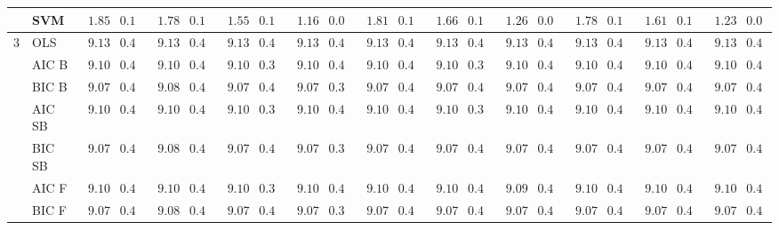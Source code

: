 \begin{tabular}{p{0.2cm}p{1cm}|p{0.6cm}p{0.6cm}|p{0.6cm}p{0.6cm}p{0.6cm}p{0.6cm}p{0.6cm}p{0.6cm}|p{0.6cm}p{0.6cm}p{0.6cm}p{0.6cm}p{0.6cm}p{0.6cm}|p{0.6cm}p{0.6cm}p{0.6cm}p{0.6cm}p{0.6cm}p{0.6cm}}
 & SVM  & $\phantom{0}1.85$ & $0.14$ & $\phantom{0}1.78$ & $0.12$ & $\phantom{0}1.55$ & $0.11$ & $\phantom{0}1.16$ & $0.08$ & $\phantom{0}1.81$ & $0.12$ & $\phantom{0}1.66$ & $0.12$ & $\phantom{0}1.26$ & $0.09$ & $\phantom{0}1.78$ & $0.12$ & $\phantom{0}1.61$ & $0.10$ & $\phantom{0}1.23$ & $0.08$ \\\hline
3 & OLS  & $\phantom{0}9.13$ & $0.40$ & $\phantom{0}9.13$ & $0.40$ & $\phantom{0}9.13$ & $0.40$ & $\phantom{0}9.13$ & $0.40$ & $\phantom{0}9.13$ & $0.40$ & $\phantom{0}9.13$ & $0.40$ & $\phantom{0}9.13$ & $0.40$ & $\phantom{0}9.13$ & $0.40$ & $\phantom{0}9.13$ & $0.40$ & $\phantom{0}9.13$ & $0.40$ \\
 & AIC B  & $\phantom{0}9.10$ & $0.40$ & $\phantom{0}9.10$ & $0.40$ & $\phantom{0}9.10$ & $0.39$ & $\phantom{0}9.10$ & $0.40$ & $\phantom{0}9.10$ & $0.40$ & $\phantom{0}9.10$ & $0.39$ & $\phantom{0}9.10$ & $0.40$ & $\phantom{0}9.10$ & $0.40$ & $\phantom{0}9.10$ & $0.40$ & $\phantom{0}9.10$ & $0.40$ \\
 & BIC B  & $\phantom{0}9.07$ & $0.40$ & $\phantom{0}9.08$ & $0.40$ & $\phantom{0}9.07$ & $0.40$ & $\phantom{0}9.07$ & $0.39$ & $\phantom{0}9.07$ & $0.40$ & $\phantom{0}9.07$ & $0.40$ & $\phantom{0}9.07$ & $0.40$ & $\phantom{0}9.07$ & $0.40$ & $\phantom{0}9.07$ & $0.40$ & $\phantom{0}9.07$ & $0.40$ \\
 & AIC SB  & $\phantom{0}9.10$ & $0.40$ & $\phantom{0}9.10$ & $0.40$ & $\phantom{0}9.10$ & $0.39$ & $\phantom{0}9.10$ & $0.40$ & $\phantom{0}9.10$ & $0.40$ & $\phantom{0}9.10$ & $0.39$ & $\phantom{0}9.10$ & $0.40$ & $\phantom{0}9.10$ & $0.40$ & $\phantom{0}9.10$ & $0.40$ & $\phantom{0}9.10$ & $0.40$ \\
 & BIC SB  & $\phantom{0}9.07$ & $0.40$ & $\phantom{0}9.08$ & $0.40$ & $\phantom{0}9.07$ & $0.40$ & $\phantom{0}9.07$ & $0.39$ & $\phantom{0}9.07$ & $0.40$ & $\phantom{0}9.07$ & $0.40$ & $\phantom{0}9.07$ & $0.40$ & $\phantom{0}9.07$ & $0.40$ & $\phantom{0}9.07$ & $0.40$ & $\phantom{0}9.07$ & $0.40$ \\
 & AIC F  & $\phantom{0}9.10$ & $0.40$ & $\phantom{0}9.10$ & $0.40$ & $\phantom{0}9.10$ & $0.39$ & $\phantom{0}9.10$ & $0.40$ & $\phantom{0}9.10$ & $0.40$ & $\phantom{0}9.10$ & $0.40$ & $\phantom{0}9.09$ & $0.40$ & $\phantom{0}9.10$ & $0.40$ & $\phantom{0}9.10$ & $0.40$ & $\phantom{0}9.10$ & $0.40$ \\
 & BIC F  & $\phantom{0}9.07$ & $0.40$ & $\phantom{0}9.08$ & $0.40$ & $\phantom{0}9.07$ & $0.40$ & $\phantom{0}9.07$ & $0.39$ & $\phantom{0}9.07$ & $0.40$ & $\phantom{0}9.07$ & $0.40$ & $\phantom{0}9.07$ & $0.40$ & $\phantom{0}9.07$ & $0.40$ & $\phantom{0}9.07$ & $0.40$ & $\phantom{0}9.07$ & $0.40$ \\

\end{tabular}

